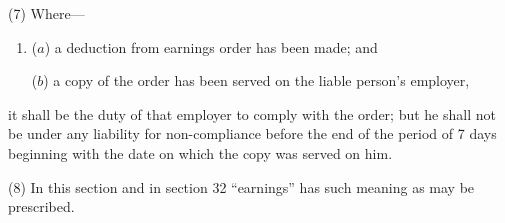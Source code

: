 \documentclass[12pt,a4paper]{article}
\begin{document}
(7) Where—
\begin{enumerate}\item[]
($a$) a deduction from earnings order has been made; and

($b$) a copy of the order has been served on the liable person’s employer,
\end{enumerate}
it shall be the duty of that employer to comply with the order; but he shall not be under any liability for non-compliance before the end of the period of 7 days beginning with the date on which the copy was served on him.

(8) In this section and in section 32 “earnings” has such meaning as may be prescribed.

%
%
%
%
%

\end{document}
